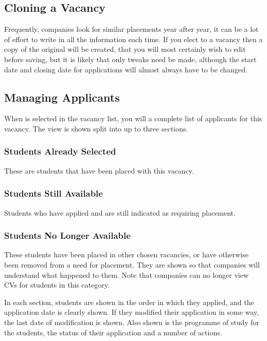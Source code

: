 \documentclass[12 pt]{book}
\begin{document}
\subsection{Cloning a Vacancy}

Frequently, companies look for similar placements year after year, it can be
a lot of effort to write in all the information each time. If you elect to
 a vacancy then a copy of the original will be created, that
you will most certainly wish to edit before saving, but it is likely that
only tweaks need be made, although the start date and closing date for 
applications will almost always have to be changed.

\subsection{Managing Applicants}

When  is selected in the vacancy list, you will a 
complete list of applicants for this vacancy. The view is shown split into
up to three sections.

\subsubsection{Students Already Selected}

These are students that have been placed with this vacancy.

\subsubsection{Students Still Available}

Students who have applied and are still indicated as requiring placement.

\subsubsection{Students No Longer Available}

These students have been placed in other chosen vacancies, or have otherwise
been removed from a need for placement. They are shown so that companies will
understand what happened to them. Note that companies can no longer view CVs
for students in this category.

In each section, students are shown in the order in which they applied, and
the application date is clearly shown. If they modified their application in
some way, the last date of modification is shown. Also shown is the programme
of study for the students, the status of their application and a number of
actions.
\end{document}
